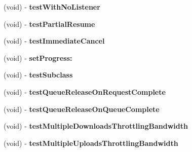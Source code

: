 \begin{DoxyCompactItemize}
\item 
\hypertarget{interface_a_s_i_network_queue_tests_a3ed1658a28f4bc0ac237d7c3793f53f1}{
(void) -\/ {\bfseries test\-With\-No\-Listener}}
\label{interface_a_s_i_network_queue_tests_a3ed1658a28f4bc0ac237d7c3793f53f1}

\item 
\hypertarget{interface_a_s_i_network_queue_tests_a3504066fbf5ecc526035321cf0a0d74a}{
(void) -\/ {\bfseries test\-Partial\-Resume}}
\label{interface_a_s_i_network_queue_tests_a3504066fbf5ecc526035321cf0a0d74a}

\item 
\hypertarget{interface_a_s_i_network_queue_tests_a5621d435f7e0be616841da617af3ae7b}{
(void) -\/ {\bfseries test\-Immediate\-Cancel}}
\label{interface_a_s_i_network_queue_tests_a5621d435f7e0be616841da617af3ae7b}

\item 
\hypertarget{interface_a_s_i_network_queue_tests_aaa3ee5989847c5200d079241b5527795}{
(void) -\/ {\bfseries set\-Progress\-:}}
\label{interface_a_s_i_network_queue_tests_aaa3ee5989847c5200d079241b5527795}

\item 
\hypertarget{interface_a_s_i_network_queue_tests_a6c75d4f9034d8f96da30002fa7c39f6a}{
(void) -\/ {\bfseries test\-Subclass}}
\label{interface_a_s_i_network_queue_tests_a6c75d4f9034d8f96da30002fa7c39f6a}

\item 
\hypertarget{interface_a_s_i_network_queue_tests_a6ebc6405b8f6639be717def3dcbcd617}{
(void) -\/ {\bfseries test\-Queue\-Release\-On\-Request\-Complete}}
\label{interface_a_s_i_network_queue_tests_a6ebc6405b8f6639be717def3dcbcd617}

\item 
\hypertarget{interface_a_s_i_network_queue_tests_a8367da7729b914e691602cbfbb0cd4d6}{
(void) -\/ {\bfseries test\-Queue\-Release\-On\-Queue\-Complete}}
\label{interface_a_s_i_network_queue_tests_a8367da7729b914e691602cbfbb0cd4d6}

\item 
\hypertarget{interface_a_s_i_network_queue_tests_afecabb41732addf7e0b63960536af284}{
(void) -\/ {\bfseries test\-Multiple\-Downloads\-Throttling\-Bandwidth}}
\label{interface_a_s_i_network_queue_tests_afecabb41732addf7e0b63960536af284}

\item 
\hypertarget{interface_a_s_i_network_queue_tests_a3c936cbdc4d5d95c086acccc6b61a277}{
(void) -\/ {\bfseries test\-Multiple\-Uploads\-Throttling\-Bandwidth}}
\label{interface_a_s_i_network_queue_tests_a3c936cbdc4d5d95c086acccc6b61a277}


\end{DoxyCompactItemize}
